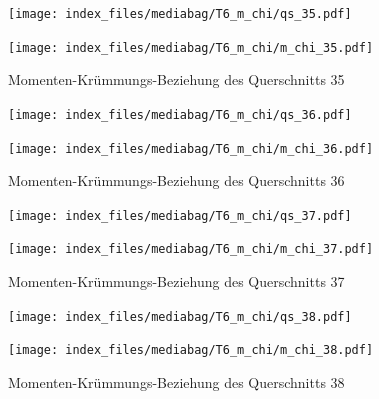 \documentclass[
  11pt,
  letterpaper,
]{scrreprt}
\begin{document}
\begin{figure}[H]

\begin{minipage}{0.50\linewidth}
\texttt{[image: index\_files/mediabag/T6\_m\_chi/qs\_35.pdf]}\end{minipage}%
%
\begin{minipage}{0.50\linewidth}
\texttt{[image: index\_files/mediabag/T6\_m\_chi/m\_chi\_35.pdf]}\end{minipage}%

\caption{\label{fig-m_chi_appendix}Momenten-Krümmungs-Beziehung des
Querschnitts 35}

\end{figure}%

\begin{figure}[H]

\begin{minipage}{0.50\linewidth}
\texttt{[image: index\_files/mediabag/T6\_m\_chi/qs\_36.pdf]}\end{minipage}%
%
\begin{minipage}{0.50\linewidth}
\texttt{[image: index\_files/mediabag/T6\_m\_chi/m\_chi\_36.pdf]}\end{minipage}%

\caption{\label{fig-m_chi_appendix}Momenten-Krümmungs-Beziehung des
Querschnitts 36}

\end{figure}%

\begin{figure}[H]

\begin{minipage}{0.50\linewidth}
\texttt{[image: index\_files/mediabag/T6\_m\_chi/qs\_37.pdf]}\end{minipage}%
%
\begin{minipage}{0.50\linewidth}
\texttt{[image: index\_files/mediabag/T6\_m\_chi/m\_chi\_37.pdf]}\end{minipage}%

\caption{\label{fig-m_chi_appendix}Momenten-Krümmungs-Beziehung des
Querschnitts 37}

\end{figure}%

\begin{figure}[H]

\begin{minipage}{0.50\linewidth}
\texttt{[image: index\_files/mediabag/T6\_m\_chi/qs\_38.pdf]}\end{minipage}%
%
\begin{minipage}{0.50\linewidth}
\texttt{[image: index\_files/mediabag/T6\_m\_chi/m\_chi\_38.pdf]}\end{minipage}%

\caption{\label{fig-m_chi_appendix}Momenten-Krümmungs-Beziehung des
Querschnitts 38}

\end{figure}%
\end{document}

